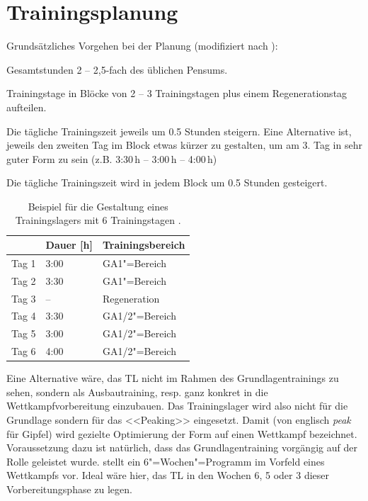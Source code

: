 \documentclass[a4paper,DIV13,BCOR0cm,draft=TRUE]{scrartcl}
\begin{document}
\section{Trainingsplanung}

Grundsätzliches Vorgehen bei der Planung (modifiziert nach ):

\begin{itemize*}
        \item Gesamtstunden 2 -- 2,5-fach des üblichen Pensums.
        \item Trainingstage in Blöcke von 2 -- 3 Trainingstagen plus einem Regenerationstag aufteilen.
        \item Die tägliche Trainingszeit jeweils um 0.5 Stunden steigern.
                Eine Alternative ist, jeweils den zweiten Tag im Block etwas kürzer zu gestalten,
                um am 3. Tag in sehr guter Form zu sein (z.B. 3:30\,h -- 3:00\,h -- 4:00\,h)
        \item Die tägliche Trainingszeit wird in jedem Block um 0.5 Stunden gesteigert.
\end{itemize*}

\begin{table}
        \centering
\begin{tabular}{lll}
    \toprule
    & Dauer [h] & Trainingsbereich \\
    \midrule
        Tag 1 & 3:00 & GA1"=Bereich \\
        Tag 2 & 3:30 & GA1"=Bereich \\
        Tag 3 & -- & Regeneration \\
        Tag 4 & 3:30 & GA1/2"=Bereich \\
        Tag 5 & 3:00 & GA1/2"=Bereich \\
        Tag 6 & 4:00 & GA1/2"=Bereich \\
    \bottomrule
\end{tabular}
\caption{Beispiel für die Gestaltung eines Trainingslagers mit 6 Trainingstagen \protect\cite{Beck2015}.}
        \label{tab:beispielplan}
\end{table}

Eine Alternative wäre, das TL nicht im Rahmen des Grundlagentrainings zu sehen,
sondern als Ausbautraining, resp. ganz konkret in die Wettkampfvorbereitung einzubauen.
Das Trainingslager wird also nicht für die Grundlage sondern für das <<Peaking>> eingesetzt.
Damit (von englisch \textit{peak} für Gipfel) wird gezielte Optimierung der Form auf einen Wettkampf bezeichnet.
Voraussetzung dazu ist natürlich, dass das Grundlagentraining vorgängig auf der Rolle geleistet wurde.
 stellt ein 6"=Wochen"=Programm im Vorfeld eines Wettkampfs vor.
Ideal wäre hier, das TL in den Wochen 6, 5 oder 3 dieser Vorbereitungsphase zu legen.
\end{document}
